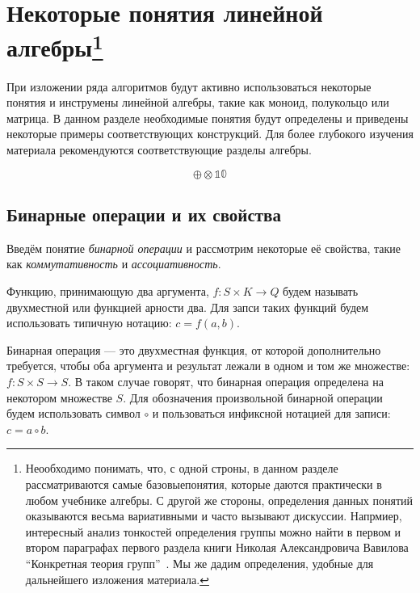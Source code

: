\chapter[Некоторые понятия линейной алгебры]{Некоторые понятия линейной алгебры\footnote{Неообходимо понимать, что, с одной строны, в данном разделе рассматриваются самые базовыепонятия, которые даются практически в любом учебнике алгебры. С другой же стороны, определения данных понятий оказываются весьма вариативными и часто вызывают дискуссии. Напрмиер, интересный анализ тонкостей определения группы можно найти в первом и втором параграфах первого раздела книги Николая Александровича Вавилова ``Конкретная теория групп''~\cite{VavilovGroups}. Мы же дадим определения, удобные для дальнейшего изложения материала.}}\label{chpt:LinAlIntro}

При изложении ряда алгоритмов будут активно использоваться некоторые понятия и инструмены линейной алгебры, такие как моноид, полукольцо или матрица.
В данном разделе необходимые понятия будут определены и приведены некоторые примеры соответствующих конструкций. Для более глубокого изучения материала рекомендуются соответствующие разделы алгебры.

$$
\oplus
\otimes
\mathbb{1}
\mathbb{0}
$$

\section{Бинарные операции и их свойства}


Введём понятие \textit{бинарной операции} и рассмотрим некоторые её свойства, такие как \textit{коммутативность} и \textit{ассоциативность}.

\begin{definition} Функцию, принимающую два аргумента, $f: S \times K \to Q$ будем называть двухместной или функцией арности два.
Для запси таких функций будем использовать типичную нотацию: $c = f(a,b)$.
\end{definition}


\begin{definition} 
Бинарная операция --- это двухместная функция, от которой дополнительно требуется, чтобы оба аргумента и результат лежали в одном и том же множестве: $f: S \times S \to S$. В таком случае говорят, что бинарная операция определена на некотором множестве $S$. Для обозначения произвольной бинарной операции будем использовать символ $\circ$ и пользоваться инфиксной нотацией для записи: $c = a \circ b$.
\end{definition}





